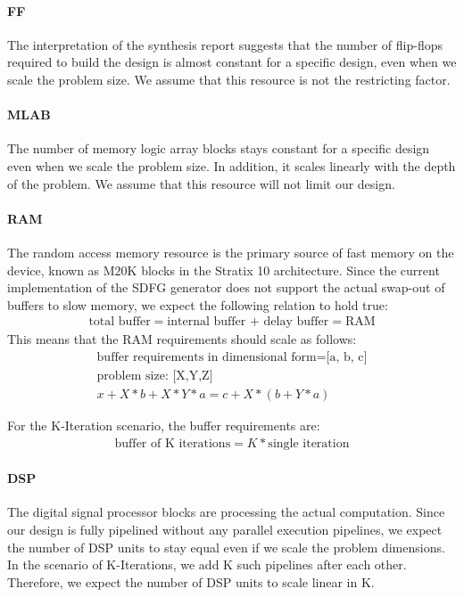  
\paragraph{FF}
The interpretation of the synthesis report suggests that the number of flip-flops required to build the design is almost constant for a specific design, even when we scale the problem size. We assume that this resource is not the restricting factor.


\paragraph{MLAB}
The number of memory logic array blocks stays constant for a specific design even when we scale the problem size. In addition, it scales linearly with the depth of the problem. We assume that this resource will not limit our design.



\paragraph{RAM}
The random access memory resource is the primary source of fast memory on the device, known as M20K blocks in the Stratix 10 architecture. Since the current implementation of the SDFG generator does not support the actual swap-out of buffers to slow memory, we expect the following relation to hold true: 
\begin{align}
\text{total buffer} = \text{internal buffer + delay buffer} = \text{RAM}
\end{align}
This means that the RAM requirements should scale as follows:
\begin{align}
	\text{buffer requirements in dimensional form} = \text{[a, b, c]}\\
	\text{problem size: [X,Y,Z]}\\
	x + X*b + X*Y*a = c + X*(b  + Y*a)
\end{align}

For the K-Iteration scenario, the buffer requirements are:
\begin{align}
	\text{buffer of K iterations} = K * \text{single iteration}
\end{align}


\paragraph{DSP}
The digital signal processor blocks are processing the actual computation. Since our design is fully pipelined without any parallel execution pipelines, we expect the number of DSP units to stay equal even if we scale the problem dimensions. \\
In the scenario of K-Iterations, we add K such pipelines after each other. Therefore, we expect the number of DSP units to scale linear in K.


